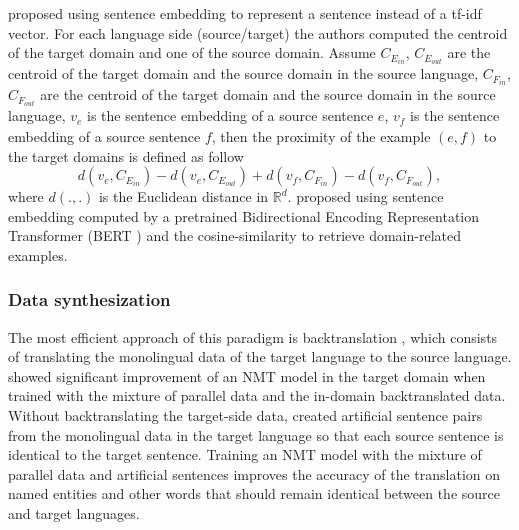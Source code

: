\citet{Wang17sentence} proposed using sentence embedding to represent a sentence instead of a tf-idf vector. For each language side (source/target) the authors computed the centroid of the target domain and one of the source domain. Assume $C_{E_{in}}$, $C_{E_{out}}$ are the centroid of the target domain and the source domain in the source language,  $C_{F_{in}}$, $C_{F_{out}}$ are the centroid of the target domain and the source domain in the source language, $v_{\mathit{e}}$ is the sentence embedding of a source sentence $\mathit{e}$, $v_{\mathit{f}}$ is the sentence embedding of a source sentence $\mathit{f}$, then the proximity of the example $(\mathit{e},\mathit{f})$ to the target domains is defined as follow
\begin{equation}
d(v_{\mathit{e}}, C_{E_{in}}) - d(v_{\mathit{e}}, C_{E_{out}}) + d(v_{\mathit{f}}, C_{F_{in}}) - d(v_{\mathit{f}}, C_{F_{out}}),
\end{equation} 
where $d(.,.)$ is the Euclidean distance in $\mathbb{R}^d$. \citet{Aharoni20unsupervised} proposed using sentence embedding computed by a pretrained Bidirectional Encoding Representation Transformer (BERT ) and the cosine-similarity to retrieve domain-related examples.

\subsubsection{Data synthesization}
The most efficient approach of this paradigm is backtranslation \citep{Sennrich16improving}, which consists of translating the monolingual data of the target language to the source language. \citet{Burlot18using} showed significant improvement of an NMT model in the target domain when trained with the mixture of parallel data and the in-domain backtranslated data. Without backtranslating the target-side data, \citet{Currey17copied} created artificial sentence pairs from the monolingual data in the target language so that each source sentence is identical to the target sentence. Training an NMT model with the mixture of parallel data and artificial sentences improves the accuracy of the translation on named entities and other words that should remain identical between the source and target languages. 

